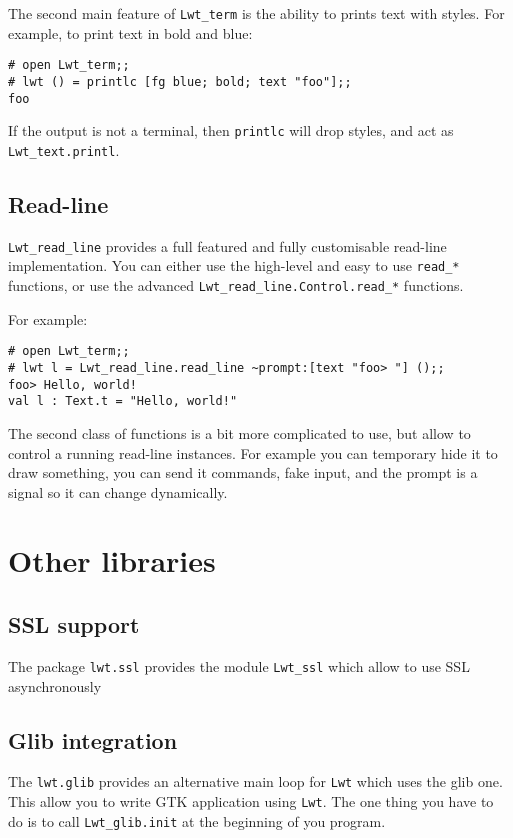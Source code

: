 \documentclass{article}
\newcommand{\lwt}{\texttt{Lwt}\xspace}
\begin{document}
The second main feature of \texttt{Lwt\_term} is the ability to prints
text with styles. For example, to print text in bold and blue:

\begin{verbatim}
# open Lwt_term;;
# lwt () = printlc [fg blue; bold; text "foo"];;
foo
\end{verbatim}

If the output is not a terminal, then \texttt{printlc} will drop
styles, and act as \texttt{Lwt\_text.printl}.

\subsection{Read-line}

\texttt{Lwt\_read\_line} provides a full featured and fully
customisable read-line implementation. You can either use the
high-level and easy to use \texttt{read\_*} functions, or use the
advanced \texttt{Lwt\_read\_line.Control.read\_*} functions.

For example:

\begin{verbatim}
# open Lwt_term;;
# lwt l = Lwt_read_line.read_line ~prompt:[text "foo> "] ();;
foo> Hello, world!
val l : Text.t = "Hello, world!"
\end{verbatim}

The second class of functions is a bit more complicated to use, but
allow to control a running read-line instances. For example you can
temporary hide it to draw something, you can send it commands, fake
input, and the prompt is a signal so it can change dynamically.

\section{Other libraries}

\subsection{SSL support}

The package \texttt{lwt.ssl} provides the module \texttt{Lwt\_ssl}
which allow to use SSL asynchronously

\subsection{Glib integration}

The \texttt{lwt.glib} provides an alternative main loop for \lwt which
uses the glib one. This allow you to write GTK application using \lwt.
The one thing you have to do is to call \texttt{Lwt\_glib.init} at the
beginning of you program.
\end{document}
